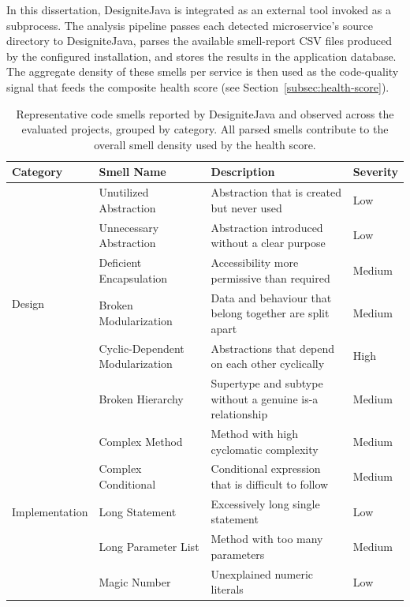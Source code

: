 In this dissertation, DesigniteJava is integrated as an external tool invoked as a subprocess. The analysis pipeline passes each detected microservice's source directory to DesigniteJava, parses the available smell-report CSV files produced by the configured installation, and stores the results in the application database. The aggregate density of these smells per service is then used as the code-quality signal that feeds the composite health score (see Section~\ref{subsec:health-score}).

\begin{table}[htbp]
    \centering
    \footnotesize
    \begin{tabular}{|l|l|p{5.5cm}|l|}
        \hline
        \textbf{Category} & \textbf{Smell Name} & \textbf{Description} & \textbf{Severity} \\
        \hline\hline
        \multirow{6}{*}{Design} & Unutilized Abstraction & Abstraction that is created but never used & Low \\
        \cline{2-4}
        & Unnecessary Abstraction & Abstraction introduced without a clear purpose & Low \\
        \cline{2-4}
        & Deficient Encapsulation & Accessibility more permissive than required & Medium \\
        \cline{2-4}
        & Broken Modularization & Data and behaviour that belong together are split apart & Medium \\
        \cline{2-4}
        & Cyclic-Dependent Modularization & Abstractions that depend on each other cyclically & High \\
        \cline{2-4}
        & Broken Hierarchy & Supertype and subtype without a genuine is-a relationship & Medium \\
        \hline
        \multirow{5}{*}{Implementation} & Complex Method & Method with high cyclomatic complexity & Medium \\
        \cline{2-4}
        & Complex Conditional & Conditional expression that is difficult to follow & Medium \\
        \cline{2-4}
        & Long Statement & Excessively long single statement & Low \\
        \cline{2-4}
        & Long Parameter List & Method with too many parameters & Medium \\
        \cline{2-4}
        & Magic Number & Unexplained numeric literals & Low \\
        \hline
    \end{tabular}
    \caption{Representative code smells reported by DesigniteJava and observed across the evaluated projects, grouped by category. All parsed smells contribute to the overall smell density used by the health score.}
    \label{tab:code-smell-categories}
\end{table}

